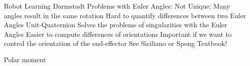 \documentclass[12pt,a4paper,oneside]{article}
\begin{document}
\newpage






\newpage

\listoftables

\newpage

\listoffigures

\newpage


Robot Learning Darmstadt
Problems with Euler Angles:
Not Unique: Many angles result in the same rotation
Hard to quantify differences between two Euler Angles
Unit-Quaternion
Solves the problems of singularities with the Euler Angles
Easier to compute differences of orientations
Important if we want to control the orientation of the end-effector
See Siciliano or Spong Textbook!


Polar moment
\end{document}
